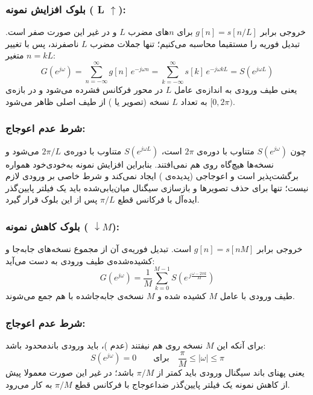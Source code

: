 
\subsubsection*{بلوک افزایش نمونه ( L $\uparrow$):}
خروجی برابر $g[n] = s[n/L]$ برای $n$های مضرب $L$ و در غیر این صورت صفر است. تبدیل فوریه را مستقیما محاسبه می‌کنیم؛ تنها جملات مضرب $L$ ناصفرند، پس با تغییر متغیر $n = kL$:
\[
G(e^{j\omega}) = \sum_{n=-\infty}^{\infty} g[n]\,e^{-j\omega n}
              = \sum_{k=-\infty}^{\infty} s[k]\,e^{-j\omega k L}
              = S(e^{j\omega L})
\]
یعنی طیف ورودی به اندازه‌ی عامل $L$ در محور فرکانس فشرده می‌شود و در بازه‌ی $[0,2\pi)$ به تعداد $L$ نسخه (تصویر یا ) از طیف اصلی ظاهر می‌شود.

\subsubsection*{شرط عدم اعوجاج:} 
چون $S(e^{j\omega})$ متناوب با دوره‌ی $2\pi$ است، $S(e^{j\omega L})$ متناوب با دوره‌ی $2\pi/L$ می‌شود و نسخه‌ها هیچ‌گاه روی هم نمی‌افتند. بنابراین افزایش نمونه به‌خودی‌خود همواره برگشت‌پذیر است و اعوجاجی (پدیده‌ی ) ایجاد نمی‌کند و شرط خاصی بر ورودی لازم نیست؛ تنها برای حذف تصویرها و بازسازی سیگنال میان‌یابی‌شده باید یک فیلتر پایین‌گذر ایده‌آل با فرکانس قطع $\pi/L$ پس از این بلوک قرار گیرد.

\subsubsection*{بلوک کاهش نمونه ( $\downarrow M$):}
خروجی برابر $g[n] = s[nM]$ است. تبدیل فوریه‌ی آن از مجموع نسخه‌های جابه‌جا و کشیده‌شده‌ی طیف ورودی به دست می‌آید:
\[
G(e^{j\omega}) = \frac{1}{M}\sum_{k=0}^{M-1} S\!\left(e^{\,j\frac{\omega - 2\pi k}{M}}\right)
\]
طیف ورودی با عامل $M$ کشیده شده و $M$ نسخه‌ی جابه‌جاشده با هم جمع می‌شوند.

\subsubsection*{شرط عدم اعوجاج:}
 برای آنکه این $M$ نسخه روی هم نیفتند (عدم )، باید ورودی باندمحدود باشد:
\[
S(e^{j\omega}) = 0 \qquad \text{برای}\quad \frac{\pi}{M} \leq |\omega| \leq \pi
\]
یعنی پهنای باند سیگنال ورودی باید کمتر از $\pi/M$ باشد؛ در غیر این صورت معمولا پیش از کاهش نمونه یک فیلتر پایین‌گذر ضداعوجاج با فرکانس قطع $\pi/M$ به کار می‌رود.


